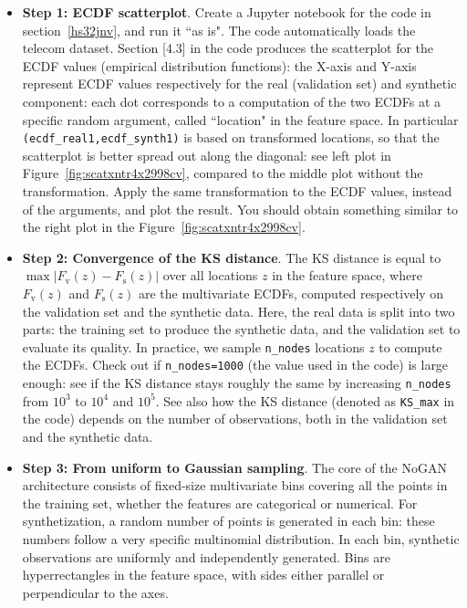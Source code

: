 \documentclass[oneside,10pt]{book}
\begin{document}
\begin{itemize}
\item[] {\bf Step 1:  ECDF scatterplot}. Create a Jupyter notebook for the code in section~\ref{hs32jnv}, and run it ``as is". The code automatically loads the telecom dataset. Section [4.3] in the code produces the scatterplot for the ECDF values (empirical distribution functions):  the X-axis and Y-axis represent ECDF values respectively for the real (validation set) and synthetic component: each dot corresponds to a
 computation of the two ECDFs  at a specific random argument, called ``location" in the feature space.
 In particular \texttt{(ecdf\_real1,ecdf\_synth1)} is based on transformed locations, so that the scatterplot
 is better spread out along the diagonal: see left plot in Figure~\ref{fig:scatxntr4x2998cv}, compared to the middle plot without the transformation. Apply the same transformation to the ECDF values, instead of the arguments, and plot the result. You should obtain
 something similar to the right plot in the  Figure~\ref{fig:scatxntr4x2998cv}.

 \vspace{1ex}
\item[] {\bf Step 2: Convergence of the KS distance}.  The KS distance is equal to $\max |F_{\text{v}}(z) -F_{\text{s}}(z)|$ over all locations $z$ in the feature space, where $F_{\text{v}}(z)$ and $F_{\text{s}}(z)$ are the multivariate ECDFs, computed respectively on the validation set and the synthetic data. Here, the real data is split into two parts: the training set to produce the synthetic data, and the validation set to
evaluate its quality. In practice, we sample \texttt{n\_nodes} locations $z$ to compute the ECDFs. Check out if \texttt{n\_nodes=1000} (the value used in the code) is large enough: see if the KS distance stays
 roughly the same by increasing \texttt{n\_nodes} from $10^3$ to $10^4$ and $10^5$.  See also how the KS distance (denoted as \texttt{KS\_max} in the code) depends on the number of observations, both in the validation set and the synthetic data.
\vspace{1ex}

\item[]{\bf Step 3: From uniform to Gaussian sampling}. The core of the \textcolor{index}{NoGAN} architecture consists of fixed-size multivariate bins
 covering all the points in the training set, whether the features are categorical or numerical. For synthetization, a random number of points is generated in each bin: these numbers follow a very specific \textcolor{index}{multinomial distribution}. In each bin, 
 synthetic observations are uniformly and independently generated. Bins are \textcolor{index}{hyperrectangles} in the feature space, with sides either parallel or perpendicular to the axes. 


\end{itemize}
\end{document}
